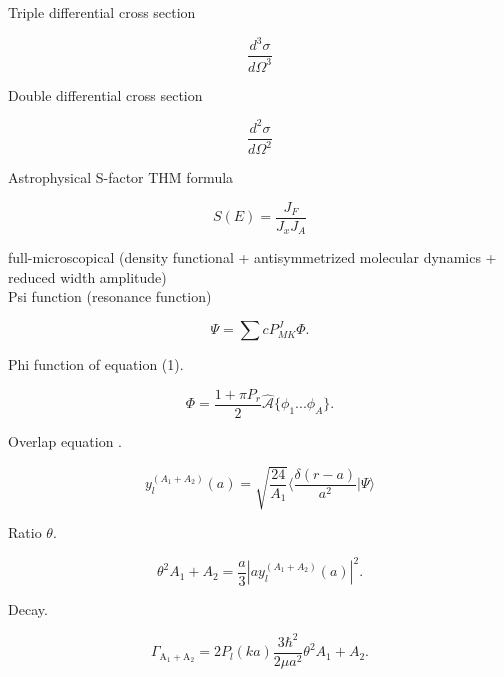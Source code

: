 \documentclass[openany]{book}
\begin{document}
Triple differential cross section 

 \begin{equation}\label{eq:middleFusion_THM_tripleDifferential}
	\frac{d^3\sigma}{d\Omega^3}
\end{equation}

Double differential cross section 

 \begin{equation}\label{eq:middleFusion_THM_doubleDifferential}
	\frac{d^2\sigma}{d\Omega^2}
\end{equation}

Astrophysical S-factor THM formula
 
 \begin{equation}\label{eq:middleFusion_THM_sfactorFormula}
 	S(E) = \frac{J_F}{J_xJ_A} 
 \end{equation}
  
full-microscopical (density functional +  antisymmetrized molecular dynamics + reduced width amplitude) \cite{taniguchi_kimura_2021} \\

Psi function (resonance function)

\begin{equation}\label{eq:middleFusion_AMD_waveFunction}
	\Psi = \sum c P^{J}_{MK} \Phi.
\end{equation}

Phi function of equation (1).

\begin{equation}\label{eq:middleFusion_AMD_waves}
	\Phi = \frac{1 + \pi P_r}{2} \hat{\mathcal{A}} \{\phi_1 ... \phi_A\}.
\end{equation}

Overlap equation . 

\begin{equation}\label{eq:middleFusion_decayRate_overlap}
	y^{(A_1 + A_2)}_l(a) = \sqrt {\frac{24}{A_1}} \langle \frac{ \delta(r - a)}{a^2} | \Psi \rangle
\end{equation}


Ratio $\theta$.

\begin{equation}\label{eq:middleFusion_decayRate_theta}
	\theta^{2}{A_1 + A_2} = \frac{a}{3} |ay^{(A_1 + A_2)}_l(a)|^2.
\end{equation}

Decay.

\begin{equation}\label{eq:middleFusion_decayRate}
	\Gamma_{\mathrm{A_1 + A_2}} = 2 P_l(ka) \frac{3\hbar^2}{2\mu a^2} \theta^{2}{A_1 + A_2}.
\end{equation}
\end{document}

